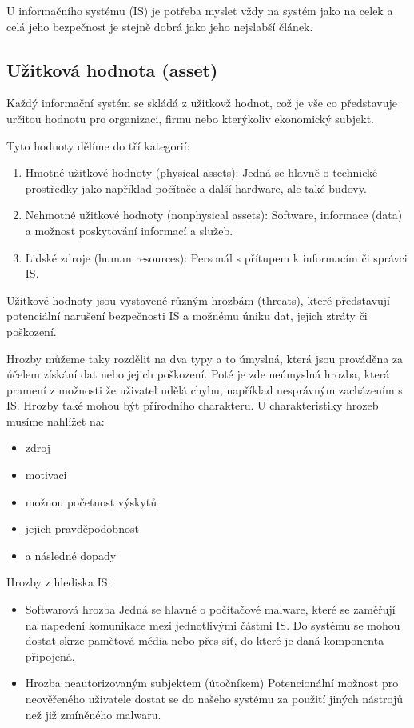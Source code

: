 \documentclass{szzclass}
\begin{document}
U informačního systému (IS) je potřeba myslet vždy na systém jako na celek a celá jeho
bezpečnost je stejně dobrá jako jeho nejslabší článek.

\subsection{Užitková hodnota (asset)}

Každý informační systém se skládá z užitkovž hodnot, což je vše co představuje určitou hodnotu pro organizaci, firmu nebo kterýkoliv ekonomický subjekt.

Tyto hodnoty dělíme do tří kategorií:
\begin{enumerate}
    \item Hmotné užitkové hodnoty (physical assets):
          Jedná se hlavně o technické prostředky jako například počítače a další hardware, ale také budovy.
    \item Nehmotné užitkové hodnoty (nonphysical assets):
          Software, informace (data) a možnost poskytování informací a služeb.
    \item Lidské zdroje (human resources):
          Personál s přítupem k informacím či správci IS.
\end{enumerate}

Užitkové hodnoty jsou vystavené různým hrozbám (threats), které představují potenciální narušení bezpečnosti IS a možnému úniku dat, jejich ztráty
či poškození.

\newpage

Hrozby můžeme taky rozdělit na dva typy a to úmyslná, která jsou prováděna za účelem získání dat nebo jejich poškození. Poté je zde neúmyslná hrozba,
která pramení z možnosti že uživatel udělá chybu, například nesprávným zacházením s IS. Hrozby také mohou být přírodního charakteru.
U charakteristiky hrozeb musíme nahlížet na:
\begin{itemize}
    \item zdroj
    \item motivaci
    \item možnou početnost výskytů
    \item jejich pravděpodobnost
    \item a následné dopady
\end{itemize}

Hrozby z hlediska IS:
\begin{itemize}
    \item Softwarová hrozba
          Jedná se hlavně o počítačové malware, které se zaměřují na napedení komunikace mezi jednotlivými částmi IS. Do systému
          se mohou dostat skrze paměťová média nebo přes síť, do které je daná komponenta připojená.
    \item Hrozba neautorizovaným subjektem (útočníkem)
          Potencionální možnost pro neověřeného uživatele dostat se do našeho systému za použití jiných nástrojů než již zmíněného malwaru.
\end{itemize}
\end{document}
